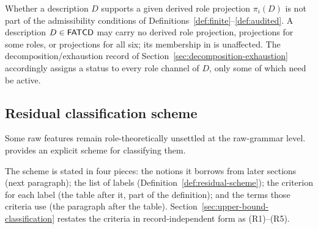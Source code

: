 \begin{remark}\label{rem:projection-vs-membership}
Whether a description \(D\) supports a given derived role projection
\(\pi_i(D)\) is not part of the admissibility conditions of
Definitions~\ref{def:finite}--\ref{def:audited}. A description
\(D \in \mathsf{FATCD}{}\) may carry no derived role projection, projections
for some roles, or projections for all six; its membership in
\FATCD{} is unaffected. The decomposition/exhaustion record of
Section~\ref{sec:decomposition-exhaustion} accordingly assigns a
status to every role channel of \(D\), only some of which need be
active.
\end{remark}

\subsection{Residual classification scheme}\label{subsec:residual-classification}

Some raw features remain role-theoretically unsettled at the
raw-grammar level. \FATCD{} provides an explicit scheme for
classifying them.

The scheme is stated in four pieces: the notions it borrows from later
sections (next paragraph); the list of labels (Definition~\ref{def:residual-scheme});
the criterion for each label (the table after it, part of the definition); and
the terms those criteria use (the paragraph after the table).
Section~\ref{sec:upper-bound-classification} restates the criteria in
record-independent form as (R1)--(R5).

